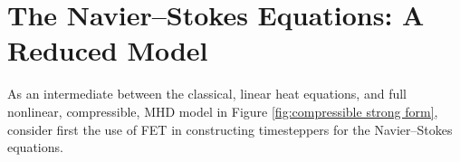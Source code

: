 \section{The Navier--Stokes Equations: A Reduced Model}
    As an intermediate between the classical, linear heat equations, and full nonlinear, compressible, MHD model in Figure \ref{fig:compressible strong form}, consider first the use of FET in constructing timesteppers for the Navier--Stokes equations.


    
    